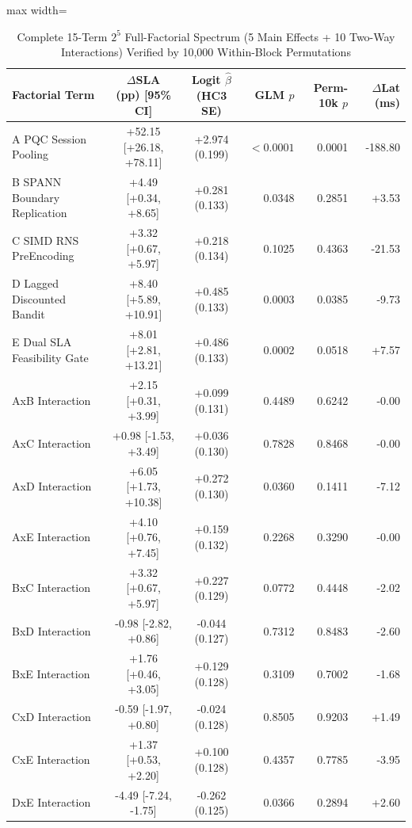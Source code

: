 \documentclass[10pt,journal,compsoc]{IEEEtran}
\begin{document}
\begin{table}[!t]
\centering
\caption{Complete 15-Term $2^5$ Full-Factorial Spectrum (5 Main Effects + 10 Two-Way Interactions) Verified by 10,000 Within-Block Permutations}
\label{tab:s_glm15}
\footnotesize
\begin{adjustbox}{max width=\textwidth}
\begin{tabular}{lccrrr}
\toprule
\textbf{Factorial Term} & \textbf{$\Delta$SLA (pp) [95\% CI]} & \textbf{Logit $\hat{\beta}$ (HC3 SE)} & \textbf{GLM $p$} & \textbf{Perm-10k $p$} & \textbf{$\Delta$Lat (ms)} \\
\midrule
A PQC Session Pooling & +52.15 [+26.18, +78.11] & +2.974 (0.199) & $<0.0001$ & 0.0001 & -188.80 \\
B SPANN Boundary Replication & +4.49 [+0.34, +8.65] & +0.281 (0.133) & 0.0348 & 0.2851 & +3.53 \\
C SIMD RNS PreEncoding & +3.32 [+0.67, +5.97] & +0.218 (0.134) & 0.1025 & 0.4363 & -21.53 \\
D Lagged Discounted Bandit & +8.40 [+5.89, +10.91] & +0.485 (0.133) & 0.0003 & 0.0385 & -9.73 \\
E Dual SLA Feasibility Gate & +8.01 [+2.81, +13.21] & +0.486 (0.133) & 0.0002 & 0.0518 & +7.57 \\
\midrule
AxB Interaction & +2.15 [+0.31, +3.99] & +0.099 (0.131) & 0.4489 & 0.6242 & -0.00 \\
AxC Interaction & +0.98 [-1.53, +3.49] & +0.036 (0.130) & 0.7828 & 0.8468 & -0.00 \\
AxD Interaction & +6.05 [+1.73, +10.38] & +0.272 (0.130) & 0.0360 & 0.1411 & -7.12 \\
AxE Interaction & +4.10 [+0.76, +7.45] & +0.159 (0.132) & 0.2268 & 0.3290 & -0.00 \\
BxC Interaction & +3.32 [+0.67, +5.97] & +0.227 (0.129) & 0.0772 & 0.4448 & -2.02 \\
BxD Interaction & -0.98 [-2.82, +0.86] & -0.044 (0.127) & 0.7312 & 0.8483 & -2.60 \\
BxE Interaction & +1.76 [+0.46, +3.05] & +0.129 (0.128) & 0.3109 & 0.7002 & -1.68 \\
CxD Interaction & -0.59 [-1.97, +0.80] & -0.024 (0.128) & 0.8505 & 0.9203 & +1.49 \\
CxE Interaction & +1.37 [+0.53, +2.20] & +0.100 (0.128) & 0.4357 & 0.7785 & -3.95 \\
DxE Interaction & -4.49 [-7.24, -1.75] & -0.262 (0.125) & 0.0366 & 0.2894 & +2.60 \\
\bottomrule
\end{tabular}
\end{adjustbox}
\end{table}
\end{document}
